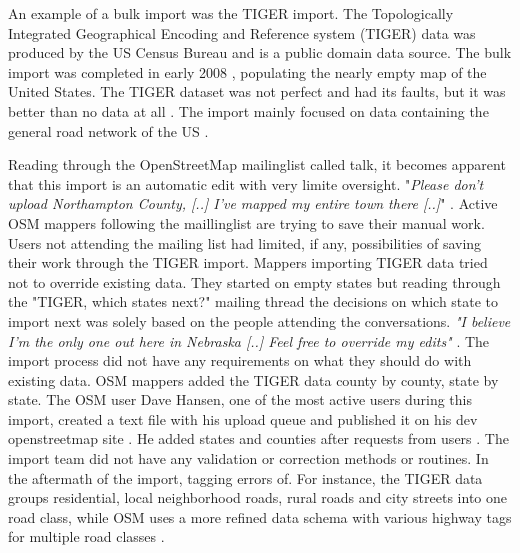 An example of a bulk import was the TIGER import. The Topologically Integrated Geographical Encoding and Reference system (TIGER) data was produced by the US Census Bureau and is a public domain data source. The bulk import was completed in early 2008 \cite{Zielstra2013}, populating the nearly empty map of the United States. The TIGER dataset was not perfect and had its faults, but it was better than no data at all \cite{Willis2008}. The import mainly focused on data containing the general road network of the US \cite{Zielstra2013}. 

Reading through the OpenStreetMap mailinglist called talk, it becomes apparent that this import is an automatic edit with very limite oversight. "\textit{Please don't upload Northampton County, [..] I've mapped my entire town there [..]}" \cite{Mielczarek2007}.  Active OSM mappers following the maillinglist are trying to save their manual work. Users not attending the mailing list had limited, if any, possibilities of saving their work through the TIGER import. Mappers importing TIGER data tried not to override existing data. They started on empty states but reading through the "TIGER, which states next?" mailing thread the decisions on which state to import next was solely based on the people attending the conversations. \textit{"I believe I'm the only one out here in Nebraska [..] Feel free to override my edits"} \cite{Bishop2007}. The import process did not have any requirements on what they should do with existing data. OSM mappers added the TIGER data county by county, state by state. The OSM user Dave Hansen, one of the most active users during this import, created a text file with his upload queue and published it on his dev openstreetmap site \cite{Hansen2007a}. He added states and counties after requests from users \cite{Hansen2007}\cite{Hansen2007b}. The import team did not have any validation or correction methods or routines. In the aftermath of the import, tagging errors of. For instance, the TIGER data groups residential, local neighborhood roads, rural roads and city streets into one road class, while OSM uses a more refined data schema with various highway tags for multiple road classes \cite{Zielstra2013}.

